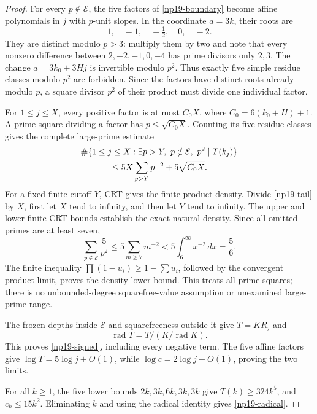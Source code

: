 \begin{proof}
For every \(p\notin\mathcal E\), the five factors of
\eqref{np19-boundary} become affine polynomials in \(j\) with
\(p\)-unit slopes. In the coordinate \(a=3k\), their roots are
\[
 1,\quad -1,\quad -\tfrac12,\quad 0,\quad -2.
\]
They are distinct modulo \(p>3\): multiply them by two and note
that every nonzero difference between \(2,-2,-1,0,-4\) has
prime divisors only \(2,3\). The change \(a=3k_0+3Hj\) is
invertible modulo \(p^2\). Thus exactly five simple residue
classes modulo \(p^2\) are forbidden. Since the factors have
distinct roots already modulo \(p\), a square divisor \(p^2\)
of their product must divide one individual factor.

For \(1\le j\le X\), every positive factor is at most \(C_0X\),
where \(C_0=6(k_0+H)+1\). A prime square dividing a factor has
\(p\le\sqrt{C_0X}\). Counting its five residue classes gives the
complete large-prime estimate
\begin{equation}
 \begin{split}
 &\#\{1\le j\le X:\exists p>Y,\ p\notin\mathcal E,\
                    p^2\mid T(k_j)\}\\
 &\hspace{12mm}\le5X\sum_{p>Y}p^{-2}+5\sqrt{C_0X}.
 \end{split}
 \label{np19-tail}
\end{equation}
For a fixed finite cutoff \(Y\), CRT gives the finite product
density. Divide \eqref{np19-tail} by \(X\), first let \(X\) tend
to infinity, and then let \(Y\) tend to infinity. The upper and
lower finite-CRT bounds establish the exact natural density.
Since all omitted primes are at least seven,
\[
 \sum_{p\notin\mathcal E}\frac5{p^2}
 \le5\sum_{m\ge7}m^{-2}
 <5\int_6^\infty x^{-2}\,dx=\frac56.
\]
The finite inequality \(\prod(1-u_i)\ge1-\sum u_i\), followed
by the convergent product limit, proves the density lower bound.
This treats all prime squares; there is no unbounded-degree
squarefree-value assumption or unexamined large-prime range.

The frozen depths inside \(\mathcal E\) and squarefreeness
outside it give \(T=KR_j\) and
\[
 \operatorname{rad}T=T/(K/\operatorname{rad}K).
\]
This proves \eqref{np19-signed}, including every negative term.
The five affine factors give \(\log T=5\log j+O(1)\), while
\(\log c=2\log j+O(1)\), proving the two limits.

For all \(k\ge1\), the five lower bounds
\(2k,3k,6k,3k,3k\) give \(T(k)\ge324k^5\), and
\(c_k\le15k^2\). Eliminating \(k\) and using the radical identity
gives \eqref{np19-radical}.
\end{proof}

